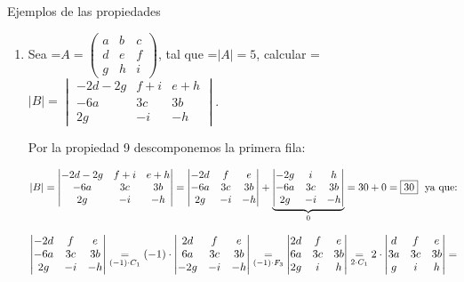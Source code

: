 \documentclass[11pt,a4paper]{article}
\newcommand{\fmm}[1]{\setbox0=\hbox{$#1$}\ifdim\wd0>\linewidth\fmdisp{#1}\else\mbox{\box0}\fi}
\newcommand{\fmdisp}[1]{\[\setbox2=\hbox{$\displaystyle #1$}\ifdim\wd2>\linewidth\resizebox{\linewidth}{!}{\box2}\else\box2\fi\]}
\begin{document}
\begin{fmex}{Ejemplos de las propiedades}
\begin{enumerate}[label=\textbf{\arabic*.},leftmargin=*]
Entonces:

\fmdisp{|A^4|=\begin{vmatrix}1 & 210 & 163\\ 0 & 269 & 210\\ 0 & 210 & 164\end{vmatrix}=1\cdot(269\cdot164-210\cdot210)=\boxed{16}}

\item Sea \fmm{A=\begin{pmatrix}a & b & c\\ d & e & f\\ g & h & i\end{pmatrix}}, tal que \fmm{|A|=5}, calcular \fmm{|B|=\begin{vmatrix}-2d-2g & f+i & e+h\\ -6a & 3c & 3b\\ 2g & -i & -h\end{vmatrix}}.

Por la propiedad 9 descomponemos la primera fila:

\fmdisp{|B|=\begin{vmatrix}-2d-2g & f+i & e+h\\ -6a & 3c & 3b\\ 2g & -i & -h\end{vmatrix}=\begin{vmatrix}-2d & f & e\\ -6a & 3c & 3b\\ 2g & -i & -h\end{vmatrix}+\underbrace{\begin{vmatrix}-2g & i & h\\ -6a & 3c & 3b\\ 2g & -i & -h\end{vmatrix}}_{0}=30+0=\boxed{30}\ \ \text{ya que:}}

\fmdisp{\begin{vmatrix}-2d & f & e\\ -6a & 3c & 3b\\ 2g & -i & -h\end{vmatrix}\underset{(-1)\cdot C_1}{=}(-1)\cdot\begin{vmatrix}2d & f & e\\ 6a & 3c & 3b\\ -2g & -i & -h\end{vmatrix}\underset{(-1)\cdot F_3}{=}\begin{vmatrix}2d & f & e\\ 6a & 3c & 3b\\ 2g & i & h\end{vmatrix}\underset{2\cdot C_1}{=}2\cdot\begin{vmatrix}d & f & e\\ 3a & 3c & 3b\\ g & i & h\end{vmatrix}=}


\end{enumerate}
\end{fmex}
\end{document}

